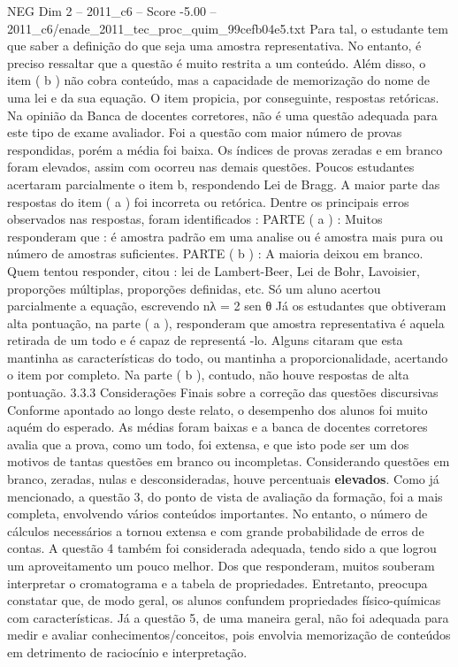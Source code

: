 \begin{textsample}{NEG Dim 2 – 2011\_c6 – Score -5.00 – 2011\_c6/enade\_2011\_tec\_proc\_quim\_99cefb04e5.txt}
Para tal, o estudante tem que saber a definição do que seja uma amostra representativa.
No entanto, é preciso ressaltar que a questão é muito restrita a um conteúdo.
Além disso, o item ( b ) não cobra conteúdo, mas a capacidade de memorização do nome de uma lei e da sua equação.
O item propicia, por conseguinte, respostas retóricas.
Na opinião da Banca de docentes corretores, não é uma questão adequada para este tipo de exame avaliador.
Foi a questão com maior número de provas respondidas, porém a média foi baixa.
Os índices de provas zeradas e em branco foram elevados, assim com ocorreu nas demais questões.
Poucos estudantes acertaram parcialmente o item b, respondendo Lei de Bragg.
A maior parte das respostas do item ( a ) foi incorreta ou retórica.
Dentre os principais erros observados nas respostas, foram identificados : PARTE ( a ) : Muitos responderam que : é amostra padrão em uma analise ou é amostra mais pura ou número de amostras suficientes.
PARTE ( b ) : A maioria deixou em branco.
Quem tentou responder, citou : lei de Lambert-Beer, Lei de Bohr, Lavoisier, proporções múltiplas, proporções definidas, etc.
Só um aluno acertou parcialmente a equação, escrevendo nλ = 2 sen θ Já os estudantes que obtiveram alta pontuação, na parte ( a ), responderam que amostra representativa é aquela retirada de um todo e é capaz de representá -lo.
Alguns citaram que esta mantinha as características do todo, ou mantinha a proporcionalidade, acertando o item por completo.
Na parte ( b ), contudo, não houve respostas de alta pontuação. 3.3.3 Considerações Finais sobre a correção das questões discursivas Conforme apontado ao longo deste relato, o desempenho dos alunos foi muito aquém do esperado.
As médias foram baixas e a banca de docentes corretores avalia que a prova, como um todo, foi extensa, e que isto pode ser um dos motivos de tantas questões em branco ou incompletas.
Considerando questões em branco, zeradas, nulas e desconsideradas, houve percentuais \textbf{elevados}.
Como já mencionado, a questão 3, do ponto de vista de avaliação da formação, foi a mais completa, envolvendo vários conteúdos importantes.
No entanto, o número de cálculos necessários a tornou extensa e com grande probabilidade de erros de contas.
A questão 4 também foi considerada adequada, tendo sido a que logrou um aproveitamento um pouco melhor.
Dos que responderam, muitos souberam interpretar o cromatograma e a tabela de propriedades.
Entretanto, preocupa constatar que, de modo geral, os alunos confundem propriedades físico-químicas com características.
Já a questão 5, de uma maneira geral, não foi adequada para medir e avaliar conhecimentos/conceitos, pois envolvia memorização de conteúdos em detrimento de raciocínio e interpretação.

\end{textsample}

